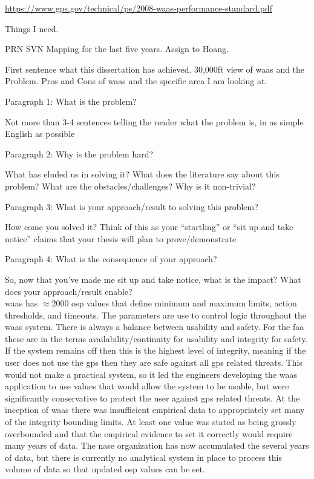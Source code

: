 \href{https://www.gps.gov/technical/ps/2008-waas-performance-standard.pdf}{https://www.gps.gov/technical/ps/2008-waas-performance-standard.pdf}

Things I need.

PRN SVN Mapping for the last five years.
Assign to Hoang.


First sentence what this dissertation has achieved.
30,000ft view of \ac{waas} and the Problem. Pros and Cons of \ac{waas} and the specific area I am looking at.

Paragraph 1: What is the problem?

Not more than 3-4 sentences telling the reader what the problem is, in as simple English as possible

Paragraph 2: Why is the problem hard?

What has eluded us in solving it? What does the literature say about this problem? What are the obstacles/challenges? Why is it non-trivial?

Paragraph 3: What is your approach/result to solving this problem?

How come you solved it? Think of this as your “startling” or “sit up and take notice” claims that your thesis will plan to prove/demonstrate

Paragraph 4: What is the consequence of your approach?

So, now that you’ve made me sit up and take notice, what is the impact? What does your approach/result enable?
~\\

\ac{waas} has $\approx$2000 \ac{osp} values that define minimum and maximum limits, action thresholds, and timeouts. The parameters are use to control logic throughout the \ac{waas} system. There is always a balance between usability and safety.  For the \ac{faa} these are in the terms availability/continuity for usability and integrity for safety.  If the system remains off then this is the highest level of integrity, meaning if the user does not use the \ac{gps} then they are safe against all \ac{gps} related threats.  This would not make a practical system, so it led the engineers developing the \ac{waas} application to use values that would allow the system to be usable, but were significantly conservative to protect the user against \ac{gps} related threats.  At the inception of \ac{waas} there was insufficient empirical data to appropriately set many of the integrity bounding limits.  At least one value was stated as being grossly overbounded and that the empirical evidence to set it correctly would require many years of data.  The \ac{nase} organization has now accumulated the several years of data, but there is currently no analytical system in place to process this volume of data so that updated \ac{osp} values can be set.

